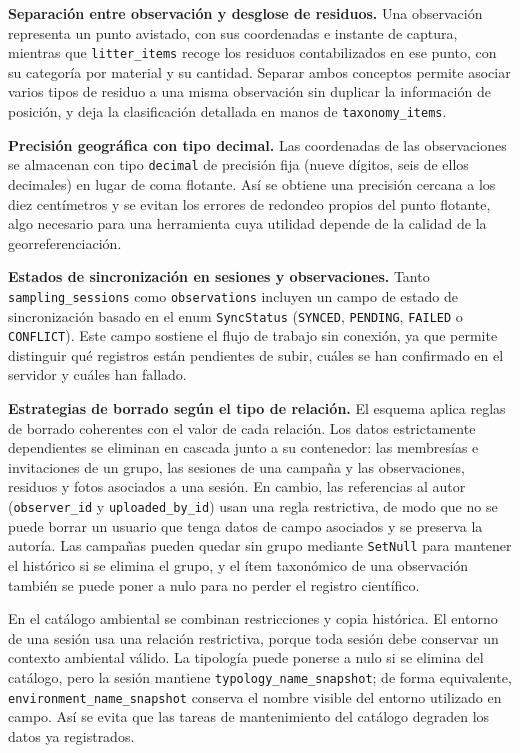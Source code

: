\textbf{Separación entre observación y desglose de residuos.}
Una observación representa un punto avistado, con sus coordenadas e instante de
captura, mientras que \texttt{litter\_items} recoge los residuos contabilizados en ese
punto, con su categoría por material y su cantidad. Separar ambos conceptos permite
asociar varios tipos de residuo a una misma observación sin duplicar la información de
posición, y deja la clasificación detallada en manos de \texttt{taxonomy\_items}.

\textbf{Precisión geográfica con tipo decimal.}
Las coordenadas de las observaciones se almacenan con tipo \texttt{decimal} de precisión
fija (nueve dígitos, seis de ellos decimales) en lugar de coma flotante. Así se obtiene
una precisión cercana a los diez centímetros y se evitan los errores de redondeo propios
del punto flotante, algo necesario para una herramienta cuya utilidad depende de la
calidad de la georreferenciación.

\textbf{Estados de sincronización en sesiones y observaciones.}
Tanto \texttt{sampling\_sessions} como \texttt{observations} incluyen un campo de estado
de sincronización basado en el enum \texttt{SyncStatus} (\texttt{SYNCED},
\texttt{PENDING}, \texttt{FAILED} o \texttt{CONFLICT}). Este campo sostiene el flujo de
trabajo sin conexión, ya que permite distinguir qué registros están pendientes de
subir, cuáles se han confirmado en el servidor y cuáles han fallado.

\textbf{Estrategias de borrado según el tipo de relación.}
El esquema aplica reglas de borrado coherentes con el valor de cada relación. Los datos
estrictamente dependientes se eliminan en cascada junto a su contenedor: las membresías
e invitaciones de un grupo, las sesiones de una campaña y las observaciones, residuos y
fotos asociados a una sesión. En cambio, las referencias al autor
(\texttt{observer\_id} y \texttt{uploaded\_by\_id}) usan una regla restrictiva, de modo
que no se puede borrar un usuario que tenga datos de campo asociados y se preserva la
autoría. Las campañas pueden quedar sin grupo mediante \texttt{SetNull} para mantener el
histórico si se elimina el grupo, y el ítem taxonómico de una observación también se
puede poner a nulo para no perder el registro científico.

En el catálogo ambiental se combinan restricciones y copia histórica. El entorno de una
sesión usa una relación restrictiva, porque toda sesión debe conservar un contexto
ambiental válido. La tipología puede ponerse a nulo si se elimina del catálogo, pero la
sesión mantiene \texttt{typology\_name\_snapshot}; de forma equivalente,
\texttt{environment\_name\_snapshot} conserva el nombre visible del entorno utilizado en
campo. Así se evita que las tareas de mantenimiento del catálogo degraden los datos ya
registrados.

